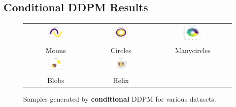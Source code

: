 \documentclass[11pt]{article}
\begin{document}
\subsection{Conditional DDPM Results}

\begin{figure}[H]
    \centering
    \begin{tabular}{ccc}
        \includegraphics[width=0.3\textwidth]{exps/ddpm_2_150_0.0001_0.02_moons/samples_conditional_150.png} &
        \includegraphics[width=0.3\textwidth]{exps/ddpm_2_150_0.0001_0.02_circles/samples_conditional_150.png} &
        \includegraphics[width=0.3\textwidth]{exps/ddpm_2_150_0.0001_0.02_manycircles/samples_conditional_150.png} \\
        Moons & Circles & Manycircles \\[0.5em]

        
        \includegraphics[width=0.3\textwidth]{exps/ddpm_2_150_0.0001_0.02_blobs/samples_conditional_150.png} &
        \includegraphics[width=0.3\textwidth]{exps/ddpm_3_150_0.0001_0.02_helix/samples_conditional_150.png} & \\
        Blobs & Helix & \\
    \end{tabular}
    \caption{Samples generated by \textbf{conditional} DDPM for various datasets.}
    \label{fig:cond_all_data}
\end{figure}
\end{document}
